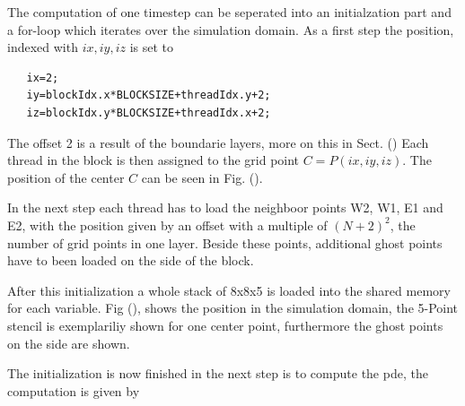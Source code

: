 The computation of one timestep can be seperated into an initialzation part and a for-loop which iterates over the simulation domain.
As a first step the position, indexed with $ix, iy, iz$ is set to

\begin{verbatim}
   ix=2;
   iy=blockIdx.x*BLOCKSIZE+threadIdx.y+2;
   iz=blockIdx.y*BLOCKSIZE+threadIdx.x+2;
\end{verbatim}

The offset 2 is a result  of the boundarie layers, more on this in Sect. ()
Each thread in the block is then assigned to the grid point $C = P(ix, iy, iz)$.
The position of the center $C$ can be seen in Fig. ().

In the next step each thread has to load the neighboor points W2, W1, E1 and E2,
with the position given by an offset with a multiple of $(N+2)^2$, the number of grid points in one layer.
Beside these points, additional ghost points have to been loaded on the side of the block.

After this initialization a whole stack of 8x8x5 is loaded into the shared memory for each variable.
Fig (), shows the position in the simulation domain, the 5-Point stencil is exemplariliy shown for one center point,
furthermore the ghost points on the side are shown.

The initialization is now finished in the next step is to compute the pde,
the computation is given by

